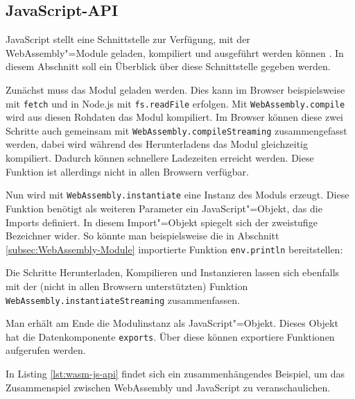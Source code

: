 \subsection{JavaScript-API}
\label{subsec:WebAssembly-JavaScript-API}
JavaScript stellt eine Schnittstelle zur Verfügung, mit der WebAssembly"=Module geladen, kompiliert und ausgeführt werden können \cite{MDNWebAssembly}. In diesem Abschnitt soll ein Überblick über diese Schnittstelle gegeben werden.

Zunächst muss das Modul geladen werden. Dies kann im Browser beispielsweise mit \lstinline{fetch} und in Node.js mit \lstinline{fs.readFile} erfolgen. Mit \lstinline{WebAssembly.compile} wird aus diesen Rohdaten das Modul kompiliert. Im Browser können diese zwei Schritte auch gemeinsam mit \lstinline{WebAssembly.compileStreaming} zusammengefasst werden, dabei wird während des Herunterladens das Modul gleichzeitig kompiliert. Dadurch können schnellere Ladezeiten erreicht werden. Diese Funktion ist allerdings nicht in allen Browsern verfügbar.

Nun wird mit \lstinline{WebAssembly.instantiate} eine Instanz des Moduls erzeugt. Diese Funktion benötigt als weiteren Parameter ein JavaScript"=Objekt, das die Imports definiert. In diesem Import"=Objekt spiegelt sich der zweistufige Bezeichner wider. So könnte man beispielsweise die in Abschnitt \ref{subsec:WebAssembly-Module} importierte Funktion \lstinline{env.println} bereitstellen:



Die Schritte Herunterladen, Kompilieren und Instanzieren lassen sich ebenfalls mit der (nicht in allen Browsern unterstützten) Funktion \lstinline{WebAssembly.instantiateStreaming} zusammenfassen.

Man erhält am Ende die Modulinstanz als JavaScript"=Objekt. Dieses Objekt hat die Datenkomponente \lstinline{exports}. Über diese können exportiere Funktionen aufgerufen werden.

In Listing \ref{lst:wasm-js-api} findet sich ein zusammenhängendes Beispiel, um das Zusammenspiel zwischen WebAssembly und JavaScript zu veranschaulichen.



